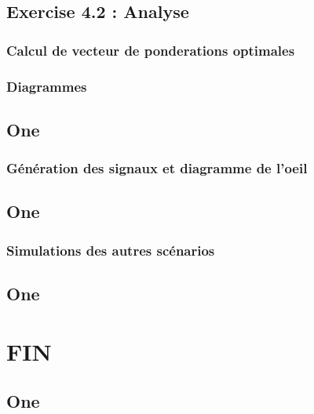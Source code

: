 \documentclass[11pt]{beamer}
\begin{document}
	\subsection{Exercise 4.2 : Analyse }
	\begin{frame}
		
	
		\frametitle{Calcul de vecteur de ponderations optimales}
	\end{frame}
	\begin{frame}

		\frametitle{Diagrammes}
	\end{frame}
\begin{frame}
	\subsection{One}
	\frametitle{Génération des signaux et diagramme de l'oeil}
\end{frame}
\begin{frame}
	\subsection{One}
	\frametitle{Simulations des autres scénarios}
\end{frame}
\begin{frame}
	\subsection{One}
	\frametitle{}
\end{frame}
%
%
	\section{FIN}
\begin{frame}
	\subsection{One}
	\frametitle{}
\end{frame}
\end{document}

